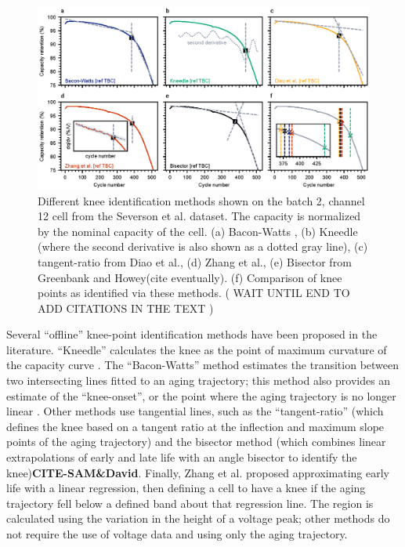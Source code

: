 \documentclass[journal=jpclcd,manuscript=article]{achemso}
\begin{document}
\begin{figure}[h!tb]
\centering
\includegraphics[scale=1]{figures/knee_identification_methods.eps}
\caption{Different knee identification methods shown on the batch 2, channel 12 cell from the Severson et al.\cite{severson_data-driven_2019} dataset. The capacity is normalized by the nominal capacity of the cell. (a) Bacon-Watts \cite{fermin-cueto_identification_2020}, (b) Kneedle \cite{satopaa_finding_2011} (where the second derivative is also shown as a dotted gray line), (c) tangent-ratio from Diao et al.\cite{diao_algorithm_2019}, (d) Zhang et al.\cite{zhang_identifying_2020}, (e) Bisector from Greenbank and Howey(cite eventually). (f) Comparison of knee points as identified via these methods. 
(
WAIT UNTIL END TO ADD CITATIONS IN THE TEXT )}
\label{fig:knee_identification_methods}
\end{figure}

Several ``offline'' knee-point identification methods have been proposed in the literature.
``Kneedle'' calculates the knee as the point of maximum curvature of the capacity curve \cite{satopaa_finding_2011}. The ``Bacon-Watts'' method estimates the transition between two intersecting lines fitted to an aging trajectory; this method also provides an estimate of the ``knee-onset'', or the point where the aging trajectory is no longer linear \cite{fermin-cueto_identification_2020}. Other methods use tangential lines, such as the ``tangent-ratio'' (which defines the knee based on a tangent ratio at the inflection and maximum slope points of the aging trajectory)\cite{diao_algorithm_2019} and the bisector method (which combines linear extrapolations of early and late life with an angle bisector to identify the knee)\textbf{CITE-SAM\&David}. Finally, Zhang et al.\cite{zhang_accelerated_2019} proposed approximating early life with a linear regression, then defining a cell to have a knee if the aging trajectory fell below a defined band about that regression line. The region is calculated using the variation in the height of a voltage peak; other methods do not require the use of voltage data and using only the aging trajectory. 
\end{document}
